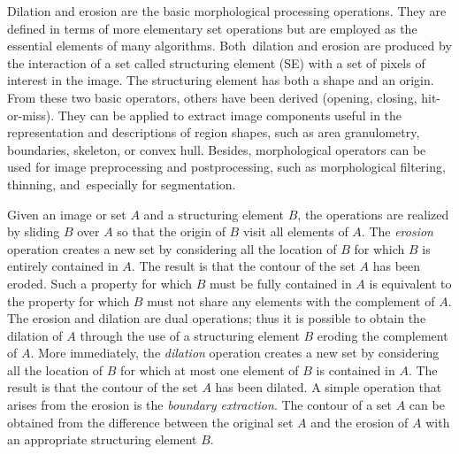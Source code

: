 \documentclass[final,a4paper,12pt,english]{UnicaPhdThesis3}
\begin{document}
Dilation and erosion are the basic morphological processing operations. They are defined in terms of more elementary set operations but are employed as the essential elements of many algorithms. Both~dilation and erosion are produced by the interaction of a set called structuring element (SE) with a set of pixels of interest in the image. The structuring element has both a shape and an origin. From these two basic operators, others have been derived (opening, closing, hit-or-miss). They can be applied to extract image components useful in the representation and descriptions of region shapes, such as area granulometry, boundaries, skeleton, or convex hull. Besides, morphological operators can be used for image preprocessing and postprocessing, such as morphological filtering, thinning, and~especially for segmentation.

Given an image or set $A$ and a structuring element $B$, the operations are realized by sliding $B$ over $A$ so that the origin of $B$ visit all elements of $A$. The \textit{erosion} operation creates a new set by considering all the location of $B$ for which $B$ is entirely contained in $A$. The result is that the contour of the set $A$ has been eroded. Such a property for which $B$ must be fully contained in $A$ is equivalent to the property for which $B$ must not share any elements with the complement of $A$. The erosion and dilation are dual operations; thus it is possible to obtain the dilation of $A$ through the use of a structuring element $B$ eroding the complement of $A$. More immediately, the \textit{dilation} operation creates a new set by considering all the location of $B$ for which at most one element of $B$ is contained in $A$. The result is that the contour of the set $A$ has been dilated. A simple operation that arises from the erosion is the \textit{boundary extraction}. The contour of a set $A$ can be obtained from the difference between the original set $A$ and the erosion of $A$ with an appropriate structuring element $B$.
\end{document}
